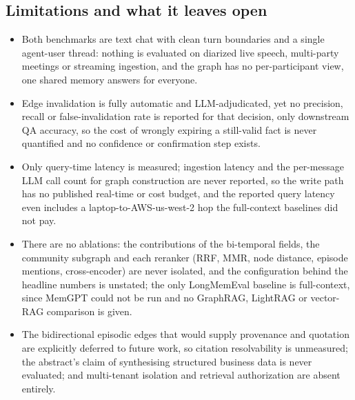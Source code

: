 \subsection{Limitations and what it leaves open}
\begin{itemize}[leftmargin=*, itemsep=1pt, topsep=2pt]
  \item Both benchmarks are text chat with clean turn boundaries and a single agent-user thread: nothing is evaluated on diarized live speech, multi-party meetings or streaming ingestion, and the graph has no per-participant view, one shared memory answers for everyone.
  \item Edge invalidation is fully automatic and LLM-adjudicated, yet no precision, recall or false-invalidation rate is reported for that decision, only downstream QA accuracy, so the cost of wrongly expiring a still-valid fact is never quantified and no confidence or confirmation step exists.
  \item Only query-time latency is measured; ingestion latency and the per-message LLM call count for graph construction are never reported, so the write path has no published real-time or cost budget, and the reported query latency even includes a laptop-to-AWS-us-west-2 hop the full-context baselines did not pay.
  \item There are no ablations: the contributions of the bi-temporal fields, the community subgraph and each reranker (RRF, MMR, node distance, episode mentions, cross-encoder) are never isolated, and the configuration behind the headline numbers is unstated; the only LongMemEval baseline is full-context, since MemGPT could not be run and no GraphRAG, LightRAG or vector-RAG comparison is given.
  \item The bidirectional episodic edges that would supply provenance and quotation are explicitly deferred to future work, so citation resolvability is unmeasured; the abstract's claim of synthesising structured business data is never evaluated; and multi-tenant isolation and retrieval authorization are absent entirely.
\end{itemize}
